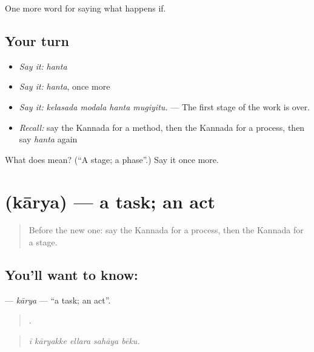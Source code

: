 \begin{grammarlens}[title={What you've built}]
One more word for saying what happens if.
\end{grammarlens}

\subsection*{Your turn}
\begin{itemize}
\raggedright
  \item \emph{Say it:} \emph{hanta}
  \item \emph{Say it:} \emph{hanta}, once more
  \item \emph{Say it:} \emph{kelasada modala hanta mugiyitu.} — The first stage of the work is over.
  \item \emph{Recall:} say the Kannada for a method, then the Kannada for a process, then say \emph{hanta} again
\end{itemize}

\begin{tcolorbox}[breakable,colback=teal!4,colframe=teal!35!black,title={Before you move on}]
What does  mean? (\textquotedblleft{}A stage; a phase\textquotedblright{}.) Say it once more.
\end{tcolorbox}
\section[\texorpdfstring{\kn{ಕಾರ್ಯ} (kārya)}{ಕಾರ್ಯ (kārya)}]{ (kārya) — a task; an act}

\label{lesson:KA-C423-karya}



\begin{quote}
Before the new one: say the Kannada for a process, then the Kannada for a stage.
\end{quote}

\subsection*{You'll want to know: }
\textbf{} — \emph{kārya} — \textquotedblleft{}a task; an act\textquotedblright{}.

\begin{quote}
    .
\end{quote}

\begin{quote}
\emph{ī kāryakke ellara sahāya bēku.}
\end{quote}

